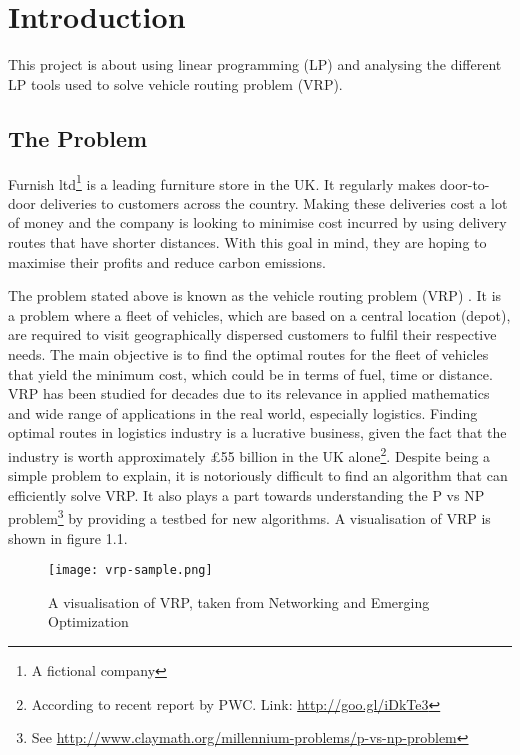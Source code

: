\chapter{Introduction}

This project is about using linear programming (LP) and analysing the different LP tools used to solve vehicle routing problem (VRP).

\section{The Problem}
Furnish ltd\footnote{A fictional company} is a leading furniture store in the UK. It regularly makes door-to-door deliveries to customers
across the country. Making these deliveries cost a lot of money and the company is looking to minimise cost incurred by using delivery routes
that have shorter distances. With this goal in mind, they are hoping to maximise their profits and reduce carbon emissions.

The problem stated above is known as the vehicle routing problem (VRP) \cite{Dantzig1959, Daneshzand2011}. It is a problem where a fleet of vehicles,
which are based on a central location (depot), are required to visit geographically dispersed customers
 to fulfil their respective needs. The main objective is to find the optimal routes for the fleet of vehicles that
 yield the minimum cost, which could be in terms of fuel, time or distance.
VRP has been studied for decades due to its relevance in applied mathematics and wide range of applications in the real world, especially logistics.
Finding optimal routes in logistics industry is a lucrative business, given the fact that the industry is worth approximately \pounds55 billion
in the UK alone\footnote{According to recent report by PWC. Link: \url{http://goo.gl/iDkTe3}}.
Despite being a simple problem to explain, it is notoriously difficult to find an algorithm that can efficiently solve VRP.
It also plays a part towards understanding the P vs NP problem\footnote{
See \url{http://www.claymath.org/millennium-problems/p-vs-np-problem}} by providing a testbed for new algorithms.
A visualisation of VRP is shown in figure 1.1.

\begin{figure}[!ht]
  \centering
    \texttt{[image: vrp-sample.png]}
    \caption{A visualisation of VRP, taken from Networking and Emerging Optimization \cite{neo:vrp}}
\end{figure}

